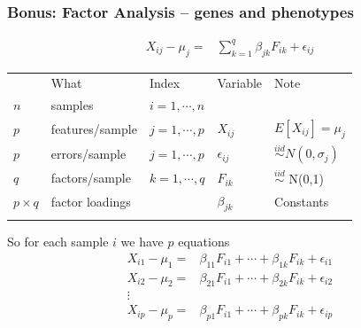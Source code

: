 \documentclass[xcolor={dvipsnames}]{beamer}
\begin{document}
\frame
{
 \frametitle{Bonus: Factor Analysis -- genes and phenotypes}

\begin{align*} %
   X_{ij} - \mu_j = {}& \sum_{k=1}^q\beta_{jk} F_{ik} + \epsilon_{ij}
\end{align*}

\begin{tabular}{lllll}
& What & Index & Variable & Note \\
$n$ & samples &  $i = 1, \cdots, n$ &   \\
$p$ & features/sample & $j = 1, \cdots, p$ & $X_{ij}$ & $E[X_{ij}] = \mu_j$\\
$p$ & errors/sample & $j = 1, \cdots, p$ & $\epsilon_{ij}$ &$\overset{iid}{\sim} N(0,\sigma_j)$\\
$q$ & factors/sample & $k = 1, \cdots, q$ & $F_{ik}$ & $\overset{iid}{\sim}$ N(0,1)\\
$p\times q$ & factor loadings &  & $\beta_{jk}$ & Constants\\
\\
\end{tabular}


So for each sample $i$ we have $p$ equations
\begin{align*} %
      X_{i1} - \mu_1 = {}& \beta_{11} F_{i1} + \cdots + \beta_{1k} F_{ik} + \epsilon_{i1} \\
      X_{i2} - \mu_2 = {}& \beta_{21} F_{i1} + \cdots + \beta_{2k} F_{ik}  + \epsilon_{i2}\\
      \vdots \\
      X_{ip} - \mu_p = {}& \beta_{p1} F_{i1} + \cdots + \beta_{pk} F_{ik}  + \epsilon_{ip}\\      
\end{align*}
}
\end{document}

